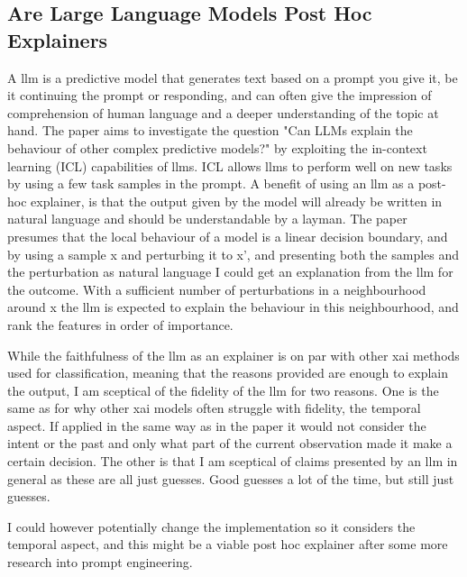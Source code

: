 \documentclass[UKenglish]{uiomasterthesis}
\begin{document}
\subsection{Are Large Language Models Post Hoc Explainers}
A \ac{llm} is a predictive model that generates text based on a prompt you give it, be it continuing the prompt or responding, and can often give the impression of comprehension of human language and a deeper understanding of the topic at hand.  The paper aims to investigate the question "Can LLMs explain the behaviour of other complex predictive models?" by exploiting the in-context learning (ICL) capabilities of \acp{llm}. ICL allows \acp{llm} to perform well on new tasks by using a few task samples in the prompt. A benefit of using an \ac{llm} as a post-hoc explainer, is that the output given by the model will already be written in natural language and should be understandable by a layman. The paper presumes that the local behaviour of a model is a linear decision boundary, and by using a sample x and perturbing it to x', and presenting both the samples and the perturbation as natural language I could get an explanation from the \ac{llm} for the outcome. With a sufficient number of perturbations in a neighbourhood around x the \ac{llm} is expected to explain the behaviour in this neighbourhood, and rank the features in order of importance.

While the faithfulness of the \ac{llm} as an explainer is on par with other \ac{xai} methods used for classification, meaning that the reasons provided are enough to explain the output, I am sceptical of the fidelity of the \ac{llm} for two reasons. One is the same as for why other \ac{xai} models often struggle with fidelity, the temporal aspect. If applied in the same way as in the paper it would not consider the intent or the past and only what part of the current observation made it make a certain decision. The other is that I am sceptical of claims presented by an \ac{llm} in general as these are all just guesses. Good guesses a lot of the time, but still just guesses. 

I could however potentially change the implementation so it considers the temporal aspect, and this might be a viable post hoc explainer after some more research into prompt engineering.
\end{document}
